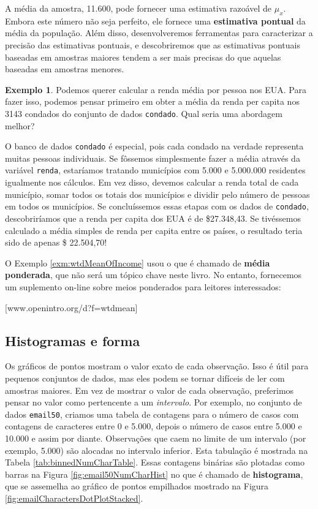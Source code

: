 \documentclass[
]{book}
\theoremstyle{definition}
\theoremstyle{definition}
\newtheorem{example}{Exemplo}[chapter]
\theoremstyle{definition}
\theoremstyle{definition}
\theoremstyle{remark}
\begin{document}
A média da amostra, 11.600, pode fornecer uma estimativa razoável de \(\mu_x\). Embora este número não seja perfeito, ele fornece uma \textbf{estimativa pontual} da média da população. Além disso, desenvolveremos ferramentas para caracterizar a precisão das estimativas pontuais, e descobriremos que as estimativas pontuais baseadas em amostras maiores tendem a ser mais precisas do que aquelas baseadas em amostras menores.

\begin{example}
\protect\hypertarget{exm:wtdMeanOfIncome}{}{\label{exm:wtdMeanOfIncome} }Podemos querer calcular a renda média por pessoa nos EUA. Para fazer isso, podemos pensar primeiro em obter a média da renda per capita nos 3143 condados do conjunto de dados \texttt{condado}. Qual seria uma abordagem melhor?
\end{example}

O banco de dados \texttt{condado} é especial, pois cada condado na verdade representa muitas pessoas individuais. Se fôssemos simplesmente fazer a média através da variável \texttt{renda}, estaríamos tratando municípios com 5.000 e 5.000.000 residentes igualmente nos cálculos. Em vez disso, devemos calcular a renda total de cada município, somar todos os totais dos municípios e dividir pelo número de pessoas em todos os municípios. Se concluíssemos essas etapas com os dados de \texttt{condado}, descobriríamos que a renda per capita dos EUA é de \$27.348,43. Se tivéssemos calculado a média simples de renda per capita entre os países, o resultado teria sido de apenas \$ 22.504,70!

O Exemplo \ref{exm:wtdMeanOfIncome} usou o que é chamado de \textbf{média ponderada}, que não será um tópico chave neste livro. No entanto, fornecemos um suplemento on-line sobre meios ponderados para leitores interessados:

\begin{center}
[www.openintro.org/d?f=wtdmean]
\end{center}

\hypertarget{histogramsAndShape}{%
\subsection{Histogramas e forma}\label{histogramsAndShape}}

Os gráficos de pontos mostram o valor exato de cada observação. Isso é útil para pequenos conjuntos de dados, mas eles podem se tornar difíceis de ler com amostras maiores. Em vez de mostrar o valor de cada observação, preferimos pensar no valor como pertencente a um \emph{intervalo}. Por exemplo, no conjunto de dados \texttt{email50}, criamos uma tabela de contagens para o número de casos com contagens de caracteres entre 0 e 5.000, depois o número de casos entre 5.000 e 10.000 e assim por diante. Observações que caem no limite de um intervalo (por exemplo, 5.000) são alocadas no intervalo inferior. Esta tabulação é mostrada na Tabela \ref{tab:binnedNumCharTable}. Essas contagens binárias são plotadas como barras na Figura \ref{fig:email50NumCharHist} no que é chamado de \textbf{histograma}, que se assemelha ao gráfico de pontos empilhados mostrado na Figura \ref{fig:emailCharactersDotPlotStacked}.
\end{document}
